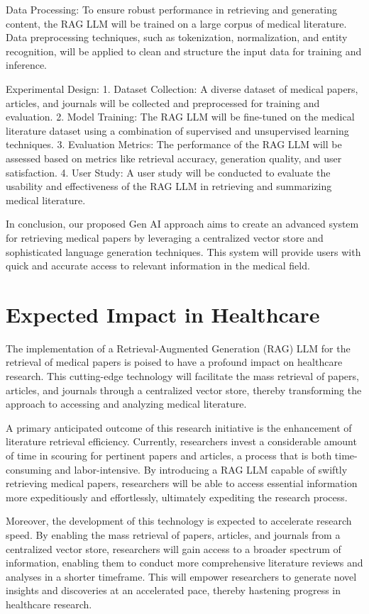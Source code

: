 \documentclass{article}
\begin{document}
Data Processing:
To ensure robust performance in retrieving and generating content, the RAG LLM will be trained on a large corpus of medical literature. Data preprocessing techniques, such as tokenization, normalization, and entity recognition, will be applied to clean and structure the input data for training and inference.

Experimental Design:
1. Dataset Collection: A diverse dataset of medical papers, articles, and journals will be collected and preprocessed for training and evaluation.
2. Model Training: The RAG LLM will be fine-tuned on the medical literature dataset using a combination of supervised and unsupervised learning techniques.
3. Evaluation Metrics: The performance of the RAG LLM will be assessed based on metrics like retrieval accuracy, generation quality, and user satisfaction.
4. User Study: A user study will be conducted to evaluate the usability and effectiveness of the RAG LLM in retrieving and summarizing medical literature.

In conclusion, our proposed Gen AI approach aims to create an advanced system for retrieving medical papers by leveraging a centralized vector store and sophisticated language generation techniques. This system will provide users with quick and accurate access to relevant information in the medical field.

\section*{Expected Impact in Healthcare}
The implementation of a Retrieval-Augmented Generation (RAG) LLM for the retrieval of medical papers is poised to have a profound impact on healthcare research. This cutting-edge technology will facilitate the mass retrieval of papers, articles, and journals through a centralized vector store, thereby transforming the approach to accessing and analyzing medical literature.

A primary anticipated outcome of this research initiative is the enhancement of literature retrieval efficiency. Currently, researchers invest a considerable amount of time in scouring for pertinent papers and articles, a process that is both time-consuming and labor-intensive. By introducing a RAG LLM capable of swiftly retrieving medical papers, researchers will be able to access essential information more expeditiously and effortlessly, ultimately expediting the research process.

Moreover, the development of this technology is expected to accelerate research speed. By enabling the mass retrieval of papers, articles, and journals from a centralized vector store, researchers will gain access to a broader spectrum of information, enabling them to conduct more comprehensive literature reviews and analyses in a shorter timeframe. This will empower researchers to generate novel insights and discoveries at an accelerated pace, thereby hastening progress in healthcare research.
\end{document}
